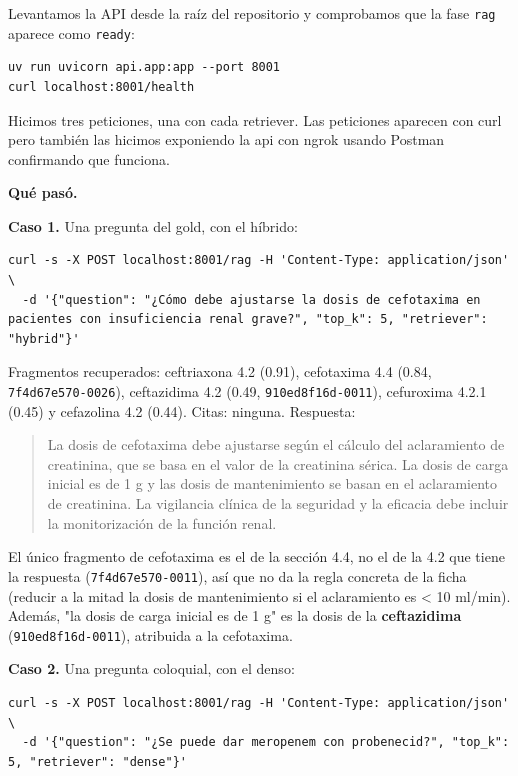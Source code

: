 Levantamos la API desde la raíz del repositorio y comprobamos que la fase \texttt{rag} aparece como
\texttt{ready}:

\begin{lstlisting}
uv run uvicorn api.app:app --port 8001
curl localhost:8001/health
\end{lstlisting}

Hicimos tres peticiones, una con cada retriever. Las peticiones
aparecen con curl pero también las hicimos exponiendo la api con ngrok usando Postman
confirmando que funciona.

\textbf{Qué pasó.}

\textbf{Caso 1.} Una pregunta del gold, con el híbrido:

\begin{lstlisting}
curl -s -X POST localhost:8001/rag -H 'Content-Type: application/json' \
  -d '{"question": "¿Cómo debe ajustarse la dosis de cefotaxima en pacientes con insuficiencia renal grave?", "top_k": 5, "retriever": "hybrid"}'
\end{lstlisting}

Fragmentos recuperados: ceftriaxona 4.2 (0.91), cefotaxima 4.4 (0.84, \texttt{7f4d67e570-0026}),
ceftazidima 4.2 (0.49, \texttt{910ed8f16d-0011}), cefuroxima 4.2.1 (0.45) y cefazolina 4.2 (0.44).
Citas: ninguna. Respuesta:

\begin{quote}
La dosis de cefotaxima debe ajustarse según el cálculo del aclaramiento de creatinina, que se
basa en el valor de la creatinina sérica. La dosis de carga inicial es de 1 g y las dosis de
mantenimiento se basan en el aclaramiento de creatinina. La vigilancia clínica de la seguridad
y la eficacia debe incluir la monitorización de la función renal.
\end{quote}

El único fragmento de cefotaxima es el de la sección 4.4, no el de la 4.2 que tiene la respuesta
(\texttt{7f4d67e570-0011}), así que no da la regla concreta de la ficha (reducir a la mitad la dosis de
mantenimiento si el aclaramiento es \textless{} 10 ml/min). Además, "la dosis de carga inicial es de 1 g"
es la dosis de la \textbf{ceftazidima} (\texttt{910ed8f16d-0011}), atribuida a la cefotaxima.

\textbf{Caso 2.} Una pregunta coloquial, con el denso:

\begin{lstlisting}
curl -s -X POST localhost:8001/rag -H 'Content-Type: application/json' \
  -d '{"question": "¿Se puede dar meropenem con probenecid?", "top_k": 5, "retriever": "dense"}'
\end{lstlisting}

